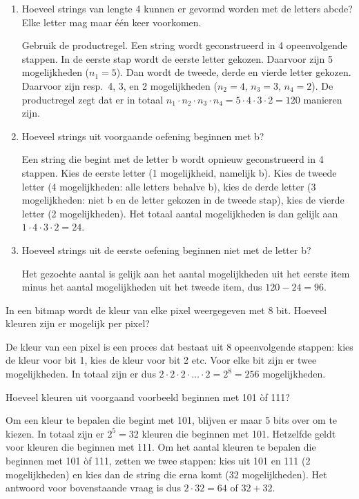\voorbeeld
\begin{enumerate}
\item Hoeveel strings van lengte 4 kunnen er gevormd worden met de letters {\sc abcde}? Elke letter mag  maar één keer voorkomen.

Gebruik de productregel. Een string wordt geconstrueerd in 4 opeenvolgende stappen. In de eerste stap wordt de eerste letter gekozen. Daarvoor zijn 5 mogelijkheden ($n_1=5$). Dan wordt de tweede, derde en vierde letter gekozen. Daarvoor zijn resp.\  4, 3, en 2 mogelijkheden ($n_2=4$, $n_3=3$, $n_4=2$). De productregel zegt dat er in totaal $n_1\cdot n_2\cdot n_3\cdot n_4=5\cdot4\cdot3\cdot 2=120$ manieren zijn.
\item Hoeveel strings uit voorgaande oefening beginnen met {\sc b}?

Een string die begint met de letter {\sc b} wordt opnieuw geconstrueerd in 4 stappen. Kies de eerste letter (1 mogelijkheid, namelijk {\sc b}). Kies de tweede letter (4 mogelijkheden: alle letters behalve {\sc b}), kies de derde letter (3 mogelijkheden: niet {\sc b} en de letter gekozen in de tweede stap), kies de vierde letter (2 mogelijkheden). Het totaal aantal mogelijkheden is dan gelijk aan $1\cdot 4\cdot 3\cdot 2=24$.
\item Hoeveel strings uit de eerste oefening beginnen niet met de letter {\sc b}?

Het gezochte aantal is gelijk aan het aantal mogelijkheden uit het eerste item minus het aantal mogelijkheden uit het tweede item, dus $120-24=96$.
\end{enumerate}

\voorbeeld
In een bitmap wordt de kleur van elke pixel weergegeven met 8 bit. Hoeveel kleuren zijn er mogelijk per pixel?

De kleur van een pixel is een proces dat bestaat uit 8 opeenvolgende stappen: kies de kleur voor bit 1, kies de kleur voor bit 2 etc. Voor elke bit zijn er twee mogelijkheden. In totaal zijn er dus $2\cdot 2 \cdot 2\cdot \dots\cdot2=2^8=256$ mogelijkheden.

\voorbeeld
Hoeveel kleuren uit voorgaand voorbeeld beginnen met 101 òf 111?

Om een kleur te bepalen die begint met 101, blijven er maar 5 bits over om te kiezen. In totaal zijn er $2^5=32$ kleuren die beginnen met 101. Hetzelfde geldt voor kleuren die beginnen met 111. Om het aantal kleuren te bepalen die beginnen met 101 òf 111, zetten we twee stappen: kies uit 101 en 111 (2 mogelijkheden) en kies dan de string die erna komt (32 mogelijkheden). Het antwoord voor bovenstaande vraag is dus $2\cdot 32=64$ of $32+32$.

